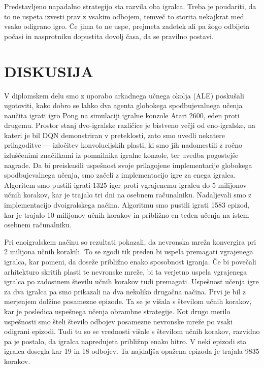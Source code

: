 \documentclass[cover]{thesis}
\begin{document}
Predstavljeno napadalno strategijo sta razvila oba igralca. Treba je poudariti, da to ne uspeta izvesti prav z vsakim odbojem, temveč to storita nekajkrat med vsako odigrano igro. Če jima to ne uspe, prejmeta zadetek ali pa žogo odbijeta počasi in nasprotniku dopustita dovolj časa, da se pravilno postavi.

\chapter{DISKUSIJA}

V diplomskem delu smo z uporabo arkadnega učnega okolja (ALE) poskušali ugotoviti, kako dobro se lahko dva agenta globokega spodbujevalnega učenja naučita igrati igro Pong na simulaciji igralne konzole Atari 2600, eden proti drugemu. Prostor stanj dvo-igralske različice je bistveno večji od eno-igralske, na kateri je bil DQN demonstriran v preteklosti, zato smo uvedli nekatere prilagoditve --- izločitev konvolucijskih plasti, ki smo jih nadomestili z ročno izluščenimi značilkami iz pomnilnika igralne konzole, ter uvedba pogostejše nagrade. Da bi preiskusili uspešnost svoje prilagojene implementacije globokega spodbujevalnega učenja, smo začeli z implementacijo igre za enega igralca. Algoritem smo pustili igrati 1325 iger proti vgrajenemu igralcu do 5 milijonov učnih korakov, kar je trajalo tri dni na osebnem računalniku. Nadaljevali smo z implementacijo dvoigralskega načina. Algoritmu smo pustili igrati 1583 epizod, kar je trajalo 10 milijonov učnih korakov in približno en teden učenja na istem osebnem računalniku.

Pri enoigralskem načinu so rezultati pokazali, da nevronska mreža konvergira pri 2 milijona učnih korakih. To se zgodi tik preden bi uspela premagati vgrajenega igralca, kar pomeni, da doseže približno enako sposobnost igranja. Če bi povečali arhitekturo skritih plasti te nevronske mreže, bi ta verjetno uspela vgrajenega igralca po zadostnem številu učnih korakov tudi premagati. Uspešnost učenja igre za dva igralca pa smo prikazali na dva nekoliko drugačna načina. Prvi je bil z merjenjem dolžine posamezne epizode. Ta se je višala s številom učnih korakov, kar je posledica uspešnega učenja obrambne strategije. Kot drugo merilo uspešnosti smo šteli število odbojev posamezne nevronske mreže po vsaki odigrani epizodi. Tudi tu so se vrednosti višale s številom učnih korakov, razvidno pa je postalo, da igralca napredujeta približnp enako hitro. V neki epizodi sta igralca dosegla kar 19 in 18 odbojev. Ta najdaljša opažena epizoda je trajala 9835 korakov.
\end{document}
